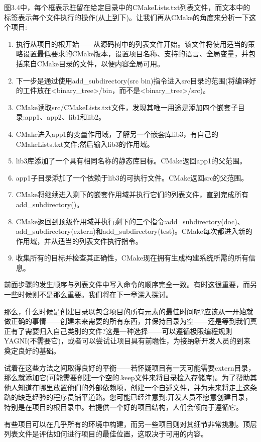 图3.4中，每个框表示驻留在给定目录中的CMakeLists.txt列表文件，而文本中的标签表示每个文件执行的操作(从上到下)。让我们再从CMake的角度来分析一下这个项目:

\begin{enumerate}
\item 
执行从项目的根开始——从源码树中的列表文件开始。该文件将使用适当的策略设置最低要求的CMake版本，设置项目名称、支持的语言、全局变量，并包括来自CMake目录的文件，以便内容全局可用。

\item 
下一步是通过使用add\_subdirectory(src bin)指令进入src目录的范围(将编译好的工件放在<binary\_tree>/bin，而不是<binary\_tree>/src)。

\item 
CMake读取src/CMakeLists.txt文件，发现其唯一用途是添加四个嵌套子目录:app1、app2、lib1和lib2。

\item 
CMake进入app1的变量作用域，了解另一个嵌套库lib3，有自己的CMakeLists.txt文件;然后输入lib3的作用域。

\item 
lib3库添加了一个具有相同名称的静态库目标。CMake返回app1的父范围。

\item 
app1子目录添加了一个依赖于lib3的可执行文件。CMake返回src的父范围。

\item 
CMake将继续进入剩下的嵌套作用域并执行它们的列表文件，直到完成所有add\_subdirectory()。

\item 
CMake返回到顶级作用域并执行剩下的三个指令:add\_subdirectory(doc)、add\_subdirectory(extern)和add\_subdirectory(test)。CMake每次都进入新的作用域，并从适当的列表文件执行指令。

\item 
收集所有的目标并检查其正确性，CMake现在拥有生成构建系统所需的所有信息。
\end{enumerate}

前面步骤的发生顺序与列表文件中写入命令的顺序完全一致。有时这很重要，而另一些时候则不是那么重要。我们将在下一章深入探讨。

那么，什么时候是创建目录以包含项目的所有元素的最佳时间呢?应该从一开始就做正确的事情——创建未来需要的所有东西，并保持目录为空——还是等到我们真正有了需要归入自己类别的文件?这是一种选择——可以遵循极限编程规则YAGNI(不需要它)，或者可以尝试让项目具有前瞻性，为接纳新开发人员的到来奠定良好的基础。

试着在这些方法之间取得良好的平衡——若怀疑项目有一天可能需要extern目录，那么就添加它(可能需要创建一个空的.keep文件来将目录检入存储库)。为了帮助其他人知道在哪里放置他们的外部依赖项，创建一个自述文件，并为未来将走上这条路的缺乏经验的程序员铺平道路。您可能已经注意到:开发人员不愿意创建目录，特别是在项目的根目录中。若提供一个好的项目结构，人们会倾向于遵循它。

有些项目可以在几乎所有的环境中构建，而另一些项目则对其细节非常挑剔。顶层列表文件是评估如何进行项目的最佳位置，这取决于可用的内容。





